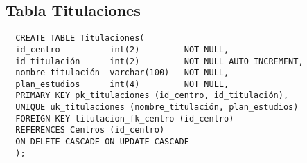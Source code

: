 \subsection{Tabla Titulaciones}

\begin{verbatim}
  CREATE TABLE Titulaciones(
  id_centro          int(2)         NOT NULL,
  id_titulación      int(2)         NOT NULL AUTO_INCREMENT,
  nombre_titulación  varchar(100)   NOT NULL,
  plan_estudios      int(4)         NOT NULL,
  PRIMARY KEY pk_titulaciones (id_centro, id_titulación),
  UNIQUE uk_titulaciones (nombre_titulación, plan_estudios)
  FOREIGN KEY titulacion_fk_centro (id_centro)
  REFERENCES Centros (id_centro)
  ON DELETE CASCADE ON UPDATE CASCADE
  );
\end{verbatim}